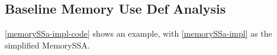 \vspace{-10pt}
\subsection{Baseline Memory Use Def Analysis} 
\label{baseline-mem-def-analysis} \vspace{-10pt}
\autoref{memorySSa-impl-code}  
shows an example, with \autoref{memorySSa-impl} as the simplified MemorySSA.

